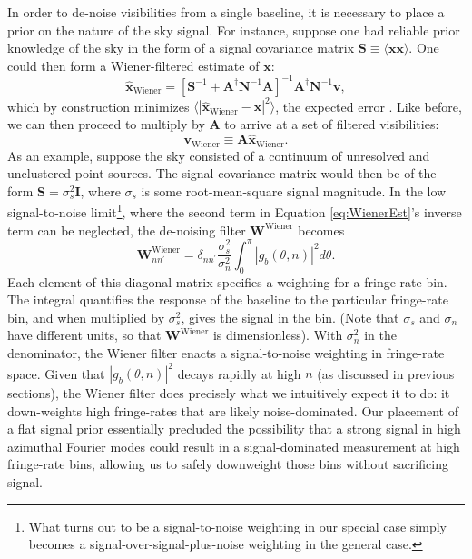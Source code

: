 \documentclass[twocolumn,apj,numberedappendix]{emulateapj}
\newcommand{\vis}{\mathbf{v}}
\newcommand{\x}{\mathbf{x}}
\newcommand{\xhat}{\hat{\mathbf{x}}}
\newcommand{\A}{\mathbf{A}}
\begin{document}
In order to de-noise visibilities from a single baseline, it is necessary to place a prior on the nature of the sky signal.  For instance, suppose one had reliable prior knowledge of the sky in the form of a signal covariance matrix $\mathbf{S} \equiv \langle \x \x \rangle$.  One could then form a Wiener-filtered estimate of $\x$:
\begin{equation}
\label{eq:WienerEst}
\xhat_\textrm{Wiener} = \left[ \mathbf{S}^{-1} + \mathbf{A}^\dagger \mathbf{N}^{-1} \mathbf{A} \right]^{-1} \mathbf{A}^\dagger \mathbf{N}^{-1} \vis,
\end{equation}
which by construction minimizes $\langle | \xhat_\textrm{Wiener} - \x |^2 \rangle$, the expected error \citep{Tegmark97}.  Like before, we can then proceed to multiply by $\mathbf{A}$ to arrive at a set of filtered visibilities:
\begin{equation}
\vis_\textrm{Wiener} \equiv \A \xhat_\textrm{Wiener}.
\end{equation}
As an example, suppose the sky consisted of a continuum of unresolved and unclustered point sources.  The signal covariance matrix would then be of the form $\mathbf{S} = \sigma_s^2 \mathbf{I}$, where $\sigma_s$ is some root-mean-square signal magnitude.  In the low signal-to-noise limit\footnote{What turns out to be a signal-to-noise weighting in our special case simply becomes a signal-over-signal-plus-noise weighting in the general case.}, where the second term in Equation \ref{eq:WienerEst}'s inverse term can be neglected, the de-noising filter $\mathbf{W}^\textrm{Wiener}$ becomes
\begin{equation}
\label{eq:WienerWeights}
\mathbf{W}^\textrm{Wiener}_{n n^\prime} = \delta_{n n^\prime} \frac{\sigma_s^2}{\sigma_n^2} \int_0^{\pi}  | g_b (\theta, n) |^2 d\theta.
\end{equation}
Each element of this diagonal matrix specifies a weighting for a fringe-rate bin.  The integral quantifies the response of the baseline to the particular fringe-rate bin, and when multiplied by $\sigma_s^2$, gives the signal in the bin.  (Note that $\sigma_s$ and $\sigma_n$ have different units, so that $\mathbf{W}^\textrm{Wiener}$ is dimensionless).  With $\sigma_n^2$ in the denominator, the Wiener filter enacts a signal-to-noise weighting in fringe-rate space.  Given that $ | g_b (\theta, n) |^2$ decays rapidly at high $n$ (as discussed in previous sections), the Wiener filter does precisely what we intuitively expect it to do: it down-weights high fringe-rates that are likely noise-dominated.  Our placement of a flat signal prior essentially precluded the possibility that a strong signal in high azimuthal Fourier modes could result in a signal-dominated measurement at high fringe-rate bins, allowing us to safely downweight those bins without sacrificing signal.
\end{document}
